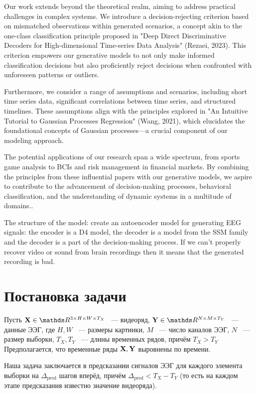 \documentclass[a4paper, 12pt]{article}
\begin{document}
	Our work extends beyond the theoretical realm, aiming to address practical challenges in complex systems. We introduce a decision-rejecting criterion based on mismatched observations within generated scenarios, a concept akin to the one-class classification principle proposed in "Deep Direct Discriminative Decoders for High-dimensional Time-series Data Analysis" (Rezaei, 2023). This criterion empowers our generative models to not only make informed classification decisions but also proficiently reject decisions when confronted with unforeseen patterns or outliers.
	
	Furthermore, we consider a range of assumptions and scenarios, including short time series data, significant correlations between time series, and structured timelines. These assumptions align with the principles explored in "An Intuitive Tutorial to Gaussian Processes Regression" (Wang, 2021), which elucidates the foundational concepts of Gaussian processes—a crucial component of our modeling approach.
	
	The potential applications of our research span a wide spectrum, from sports game analysis to BCIs and risk management in financial markets. By combining the principles from these influential papers with our generative models, we aspire to contribute to the advancement of decision-making processes, behavioral classification, and the understanding of dynamic systems in a multitude of domains..
	
	The structure of the model: create an autoencoder model for generating EEG signals: the encoder is a D4 model, the decoder is a model from the SSM family and the decoder is a part of the decision-making process. If we can't properly recover video or sound from brain recordings then it means that the generated recording is bad.


\section{Постановка задачи}
Пусть $\bX \in \dR^{3 \times H \times W \times T_X}$ ~--- видеоряд, $\bY \in \dR^{N \times M \times T_Y}$ ~--- данные ЭЭГ, где $H, W$ ~--- размеры картинки, $M$ ~--- число каналов ЭЭГ, $N$ ~--- размер выборки, $T_X, T_Y$ ~--- длины временных рядов, причём $T_X > T_Y$
Предполагается, что временные ряды $\mathbf{X}, \mathbf{Y}$ выровнены по времени.

Наша задача заключается в предсказании сигналов ЭЭГ для каждого элемента выборки на $\Delta_{\text{pred}}$ шагов вперёд, причём $\Delta_{\text{pred}} < T_X - T_Y$ (то есть на каждом этапе предсказания известно значение видеоряда).
\end{document}
